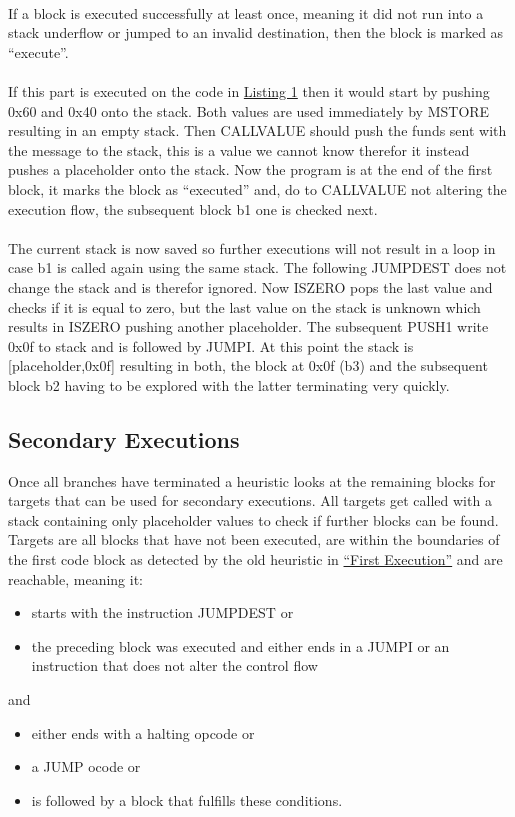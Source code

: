 \documentclass{article}
\begin{document}
\paragraph{}
    If a block is executed successfully at least once, meaning it did not run into a stack underflow or jumped to an invalid destination, then the block is marked as ``execute''. 

\paragraph{}
    If this part is executed on the code in \hyperref[code block example]{Listing 1} then it would start by pushing 0x60 and 0x40 onto the stack. Both values are used immediately by MSTORE resulting in an empty stack. Then CALLVALUE should push the funds sent with the message to the stack, this is a value we cannot know therefor it instead pushes a placeholder onto the stack. Now the program is at the end of the first block, it marks the block as ``executed'' and, do to CALLVALUE not altering the execution flow, the subsequent block b1 one is checked next.
\paragraph{}
    The current stack is now saved so further executions will not result in a loop in case b1 is called again using the same stack. The following JUMPDEST does not change the stack and is therefor ignored. Now ISZERO pops the last value and checks if it is equal to zero, but the last value on the stack is unknown which results in ISZERO pushing another placeholder. The subsequent PUSH1 write 0x0f to stack and is followed by JUMPI. At this point the stack is [placeholder,0x0f] resulting in both, the block at 0x0f (b3) and the subsequent block b2 having to be explored with the latter terminating very quickly.

\subsection{Secondary Executions}
    Once all branches have terminated a heuristic looks at the remaining blocks for targets that can be used for secondary executions. All targets get called with a stack containing only placeholder values to check if further blocks can be found. Targets are all blocks that have not been executed, are within the boundaries of the first code block as detected by the old heuristic in \hyperref[firstexec]{``First Execution''} and are reachable, meaning it:
    \begin{itemize}
        \item starts with the instruction JUMPDEST or
        \item the preceding block was executed and either ends in a JUMPI or an instruction that does not alter the control flow
    \end{itemize}
    and
    \begin{itemize}
        \item either ends with a halting opcode or
        \item a JUMP ocode or
        \item is followed by a block that fulfills these conditions.
    \end{itemize}
\end{document}
